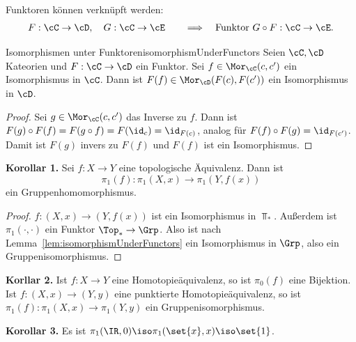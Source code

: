 \documentclass[language=ngerman]{TemplateLecture} %
\begin{document}


\begin{remark}
    Funktoren können verknüpft werden:
    \begin{align*}
        F: \cC \to \cD, \quad G: \cC \to \cE \quad \quad \Longrightarrow  \quad \text{Funktor } G \circ F: \cC \to \cE.
    \end{align*}
\end{remark}

\begin{lem}{Isomorphismen unter Funktoren}{isomorphismUnderFunctors}
    Seien $\cC, \cD$ Kateorien und $F: \cC \to \cD$ ein Funktor. Sei $f \in \Mor_\cC(c, c')$ ein Isomorphismus in $\cC$. Dann ist $F(f) \in \Mor_\cD(F(c),F(c'))$ ein Isomorphismus in $\cD$.
\end{lem}
\begin{proof}
    Sei $g \in \Mor_\cC(c, c')$ das Inverse zu $f$. Dann ist $F(g) \circ F(f) = F(g \circ f) = F(\id_c) = \id_{F(c)}$, analog für $F(f) \circ F(g) = \id_{F(c')}$. Damit ist $F(g)$ invers zu $F(f)$ und $F(f)$ ist ein Isomorphismus.
\end{proof}

\textbf{Korollar 1.} Sei $f: X \to Y$ eine topologische Äquivalenz. Dann ist 
\begin{equation*}
    \pi_1(f): \pi_1(X,x) \to \pi_1(Y,f(x))
\end{equation*}
ein Gruppenhomomorphismus.

\begin{proof}
    $f: (X,x) \to (Y,f(x))$ ist ein Isomorphismus in $\Top_*$. Außerdem ist $\pi_1(\cdot, \cdot)$ ein Funktor $\Top_* \to \Grp$. Also ist nach Lemma~\ref{lem:isomorphismUnderFunctors} ein Isomorphismus in $\Grp$, also ein Gruppenisomorphismus.
\end{proof}

\textbf{Korllar 2.} Ist $f: X \to Y$ eine Homotopieäquivalenz, so ist $\pi_0(f)$ eine Bijektion. Ist $f: (X,x) \to (Y,y)$ eine punktierte Homotopieäquivalenz, so ist $\pi_1(f): \pi_1(X,x) \to \pi_1(Y,y)$ ein Gruppenisomorphismus.

\textbf{Korollar 3.} Es ist $\pi_1(\IR, 0) \iso \pi_1(\set{x}, x) \iso \set{1}$.
\end{document}
